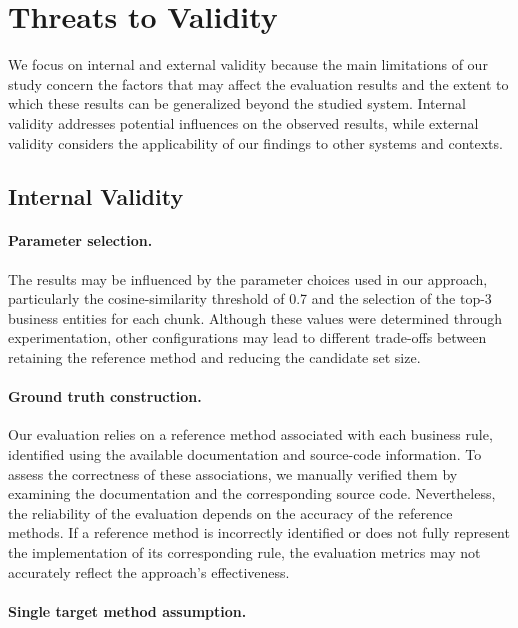 \section{Threats to Validity}
\label{sec:threats}

We focus on internal and external validity because the main limitations of our study concern the factors that may affect the evaluation results and the extent to which these results can be generalized beyond the studied system. Internal validity addresses potential influences on the observed results, while external validity considers the applicability of our findings to other systems and contexts.

\subsection{Internal Validity}

\paragraph{Parameter selection.}\noindent

The results may be influenced by the parameter choices used in our approach, particularly the cosine-similarity threshold of 0.7 and the selection of the top-3 business entities for each chunk. Although these values were determined through experimentation, other configurations may lead to different trade-offs between retaining the reference method and reducing the candidate set size.

\paragraph{Ground truth construction.}\noindent

Our evaluation relies on a reference method associated with each business rule, identified using the available documentation and source-code information. To assess the correctness of these associations, we manually verified them by examining the documentation and the corresponding source code. Nevertheless, the reliability of the evaluation depends on the accuracy of the reference methods. If a reference method is incorrectly identified or does not fully represent the implementation of its corresponding rule, the evaluation metrics may not accurately reflect the approach's effectiveness.

\paragraph{Single target method assumption.}\noindent

